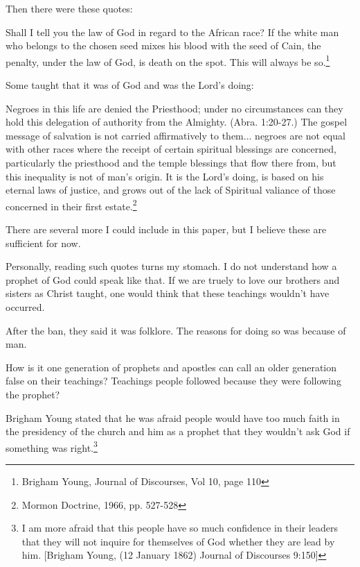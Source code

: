 \documentclass{article}
\begin{document}
Then there were these quotes:

\begin{displayquote}
Shall I tell you the law of God in regard to the African race? If the white 
man who belongs to the chosen seed mixes his blood with the seed of Cain, 
the penalty, under the law of God, is death on the spot. This will 
always be so.\footnote{Brigham Young, Journal of Discourses, Vol 10, page 110}
\end{displayquote}

Some taught that it was of God and was the Lord's doing:

\begin{displayquote}
Negroes in this life are denied the Priesthood; under no circumstances can 
they hold this delegation of authority from the Almighty. (Abra. 1:20-27.) 
The gospel message of salvation is not carried affirmatively to them... 
negroes are not equal with other races where the receipt of certain 
spiritual blessings are concerned, particularly the priesthood and 
the temple blessings that flow there from, but this inequality is 
not of man's origin. It is the Lord's doing, is based on his eternal 
laws of justice, and grows out of the lack of Spiritual valiance of those 
concerned in their first estate.\footnote{Mormon Doctrine, 1966, pp. 527-528}
\end{displayquote}

There are several more I could include in this paper, but I believe these
are sufficient for now.

Personally, reading such quotes turns my stomach. I do not understand how a 
prophet of God could speak like that. If we are truely to love our brothers
and sisters as Christ taught, one would think that these teachings wouldn't
have occurred.

After the ban, they said it was folklore. The reasons for doing so was because 
of man.

How is it one generation of prophets and apostles can call an older generation 
false on their teachings? Teachings people followed because they were following 
the prophet?

Brigham Young stated that he was afraid people would have too much faith in the 
presidency of the church and him as a prophet that they wouldn't ask God if 
something was right.\footnote{I am more afraid that this people have so much 
confidence in their leaders that they will not inquire for themselves of God 
whether they are lead by him. [Brigham Young, (12 January 1862) Journal of 
Discourses 9:150]}
\end{document}
